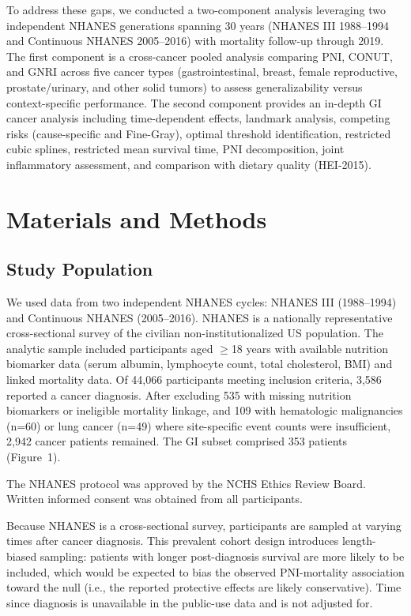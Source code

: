 \documentclass[review]{elsarticle}
\begin{document}
To address these gaps, we conducted a two-component analysis leveraging two independent NHANES generations spanning 30 years (NHANES III 1988--1994 and Continuous NHANES 2005--2016) with mortality follow-up through 2019. The first component is a cross-cancer pooled analysis comparing PNI, CONUT, and GNRI across five cancer types (gastrointestinal, breast, female reproductive, prostate/urinary, and other solid tumors) to assess generalizability versus context-specific performance. The second component provides an in-depth GI cancer analysis including time-dependent effects, landmark analysis, competing risks (cause-specific and Fine-Gray), optimal threshold identification, restricted cubic splines, restricted mean survival time, PNI decomposition, joint inflammatory assessment, and comparison with dietary quality (HEI-2015).

\section{Materials and Methods}

\subsection{Study Population}

We used data from two independent NHANES cycles: NHANES III (1988--1994) and Continuous NHANES (2005--2016). NHANES is a nationally representative cross-sectional survey of the civilian non-institutionalized US population. The analytic sample included participants aged $\ge$18 years with available nutrition biomarker data (serum albumin, lymphocyte count, total cholesterol, BMI) and linked mortality data. Of 44,066 participants meeting inclusion criteria, 3,586 reported a cancer diagnosis. After excluding 535 with missing nutrition biomarkers or ineligible mortality linkage, and 109 with hematologic malignancies (n=60) or lung cancer (n=49) where site-specific event counts were insufficient, 2,942 cancer patients remained. The GI subset comprised 353 patients (Figure~1).

The NHANES protocol was approved by the NCHS Ethics Review Board. Written informed consent was obtained from all participants.

Because NHANES is a cross-sectional survey, participants are sampled at varying times after cancer diagnosis. This prevalent cohort design introduces length-biased sampling: patients with longer post-diagnosis survival are more likely to be included, which would be expected to bias the observed PNI-mortality association toward the null (i.e., the reported protective effects are likely conservative). Time since diagnosis is unavailable in the public-use data and is not adjusted for.
\end{document}
